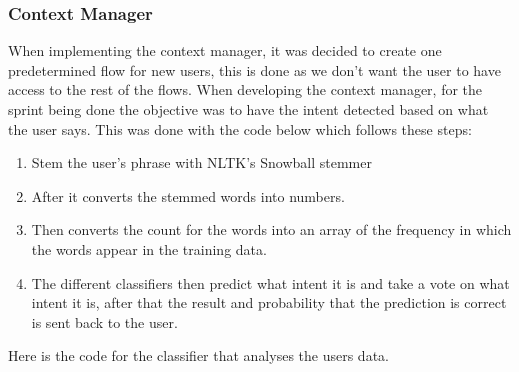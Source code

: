 \subsubsection{Context Manager}\label{sec:chap4_ori_imp_manager}

When implementing the context manager, it was decided to create one predetermined flow for new users, this is done as we don’t want the user to have access to the rest of the flows. When developing the context manager, for the sprint being done the objective was to have the intent detected based on what the user says. This was done with the code below which follows these steps:

\begin{enumerate}
	\item {Stem the user’s phrase with NLTK’s Snowball stemmer}
	\item {After it converts the stemmed words into numbers.}
	\item {Then converts the count for the words into an array of the frequency in which the words appear in the training data.}
	\item {The different classifiers then predict what intent it is and take a vote on what intent it is, after that the result and probability that the prediction is correct is sent back to the user.}
\end{enumerate}

Here is the code for the classifier that analyses the users data.

